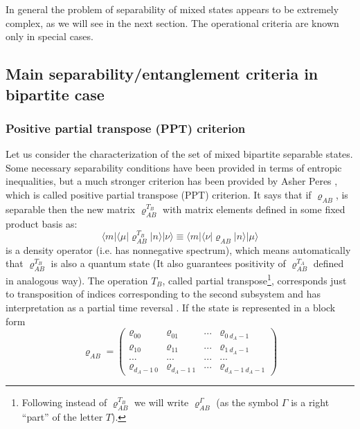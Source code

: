 \documentclass[rmp,12pt,preprint]{revtex4-2}
\begin{document}
In general the problem of separability of mixed states appears to be
extremely complex, as we will see in the next section. The operational
criteria are known only in special cases.



\subsection{Main separability/entanglement criteria in bipartite case}


\subsubsection{Positive partial transpose (PPT) criterion}

Let us consider the characterization of the set of mixed bipartite
separable states. Some necessary separability conditions have been
provided in terms of entropic inequalities, but a much stronger
criterion has been provided by Asher Peres \cite{Peres96}, which is
called positive partial transpose (PPT) criterion. It says that if
$\varrho_{AB}$, is separable then the new matrix
$\varrho_{AB}^{T_{B}}$ with matrix elements defined in some fixed
product basis as:
\begin{equation}
\langle m| \langle \mu| \varrho_{AB}^{T_{B}} |n \rangle |\nu
\rangle \equiv \langle m| \langle \nu| \varrho_{AB} |n \rangle |\mu
\rangle
\end{equation}
is a density operator (i.e. has nonnegative spectrum), which means
automatically that $\varrho_{AB}^{T_{B}}$ is also a quantum state (It
also guarantees positivity of $\varrho_{AB}^{T_{A}}$ defined in
analogous way). The operation $T_{B}$, called partial transpose\footnote{Following
  \cite{Rains1998-def} instead of $\varrho_{AB}^{T_{B}}$ we will write
  $\varrho_{AB}^{\Gamma}$ (as the symbol $\Gamma$ is a right ``part''
  of the letter $T$).}, corresponds just to
transposition of indices corresponding to the second subsystem and has
interpretation as a partial time reversal
\cite{SanperaTarrachVidal}. If the state is represented in a block
form
\begin{equation}
\varrho_{AB}=\left(\begin{array}{cccc}
\varrho_{00} & \varrho_{01} & ... & \varrho_{0 \ d_{A}-1}\\
\varrho_{10} & \varrho_{11} & ... & \varrho_{1 \ d_{A}-1}\\
 ...  &  ...  & ...   & ...  \\
\varrho_{d_{A}-1 \ 0} & \varrho_{d_{A}-1 \ 1} & ... &
\varrho_{d_{A}-1  \ d_{A}-1}
\label{tablica}
\end{array} \right)
\end{equation}
\end{document}
